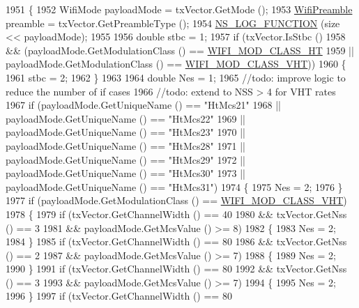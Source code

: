 \begin{DoxyCode}
1951 \{
1952   WifiMode payloadMode = txVector.GetMode ();
1953   \hyperlink{group__wifi_ga5e94a56cb338a14ffbbb19c6a41251eb}{WifiPreamble} preamble = txVector.GetPreambleType ();
1954   \hyperlink{log-macros-disabled_8h_a90b90d5bad1f39cb1b64923ea94c0761}{NS\_LOG\_FUNCTION} (size << payloadMode);
1955 
1956   \textcolor{keywordtype}{double} stbc = 1;
1957   \textcolor{keywordflow}{if} (txVector.IsStbc ()
1958       && (payloadMode.GetModulationClass () == \hyperlink{namespacens3_aa999e1221606a2b21b1eb33c2007c217a6ac45cac36cc4454649435d24ebf349c}{WIFI\_MOD\_CLASS\_HT}
1959           || payloadMode.GetModulationClass () == \hyperlink{namespacens3_aa999e1221606a2b21b1eb33c2007c217a9863e4342bf5c238c74dddfc4d96c67e}{WIFI\_MOD\_CLASS\_VHT}))
1960     \{
1961       stbc = 2;
1962     \}
1963 
1964   \textcolor{keywordtype}{double} Nes = 1;
1965   \textcolor{comment}{//todo: improve logic to reduce the number of if cases}
1966   \textcolor{comment}{//todo: extend to NSS > 4 for VHT rates}
1967   \textcolor{keywordflow}{if} (payloadMode.GetUniqueName () == \textcolor{stringliteral}{"HtMcs21"}
1968       || payloadMode.GetUniqueName () == \textcolor{stringliteral}{"HtMcs22"}
1969       || payloadMode.GetUniqueName () == \textcolor{stringliteral}{"HtMcs23"}
1970       || payloadMode.GetUniqueName () == \textcolor{stringliteral}{"HtMcs28"}
1971       || payloadMode.GetUniqueName () == \textcolor{stringliteral}{"HtMcs29"}
1972       || payloadMode.GetUniqueName () == \textcolor{stringliteral}{"HtMcs30"}
1973       || payloadMode.GetUniqueName () == \textcolor{stringliteral}{"HtMcs31"})
1974     \{
1975       Nes = 2;
1976     \}
1977   \textcolor{keywordflow}{if} (payloadMode.GetModulationClass () == \hyperlink{namespacens3_aa999e1221606a2b21b1eb33c2007c217a9863e4342bf5c238c74dddfc4d96c67e}{WIFI\_MOD\_CLASS\_VHT})
1978     \{
1979       \textcolor{keywordflow}{if} (txVector.GetChannelWidth () == 40
1980           && txVector.GetNss () == 3
1981           && payloadMode.GetMcsValue () >= 8)
1982         \{
1983           Nes = 2;
1984         \}
1985       \textcolor{keywordflow}{if} (txVector.GetChannelWidth () == 80
1986           && txVector.GetNss () == 2
1987           && payloadMode.GetMcsValue () >= 7)
1988         \{
1989           Nes = 2;
1990         \}
1991       \textcolor{keywordflow}{if} (txVector.GetChannelWidth () == 80
1992           && txVector.GetNss () == 3
1993           && payloadMode.GetMcsValue () >= 7)
1994         \{
1995           Nes = 2;
1996         \}
1997       \textcolor{keywordflow}{if} (txVector.GetChannelWidth () == 80

\end{DoxyCode}
